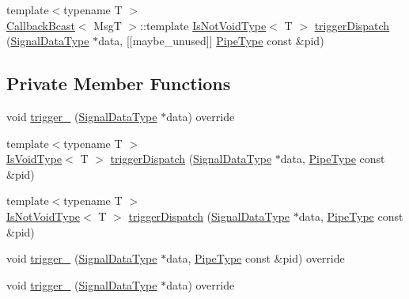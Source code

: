 \begin{DoxyCompactItemize}
\item 
{\footnotesize template$<$typename T $>$ }\\\hyperlink{structvt_1_1pipe_1_1callback_1_1_callback_bcast}{Callback\+Bcast}$<$ MsgT $>$\+::template \hyperlink{structvt_1_1pipe_1_1callback_1_1_callback_bcast_a3f5efa2edf7f4c47fe047e086e63a477}{Is\+Not\+Void\+Type}$<$ T $>$ \hyperlink{structvt_1_1pipe_1_1callback_1_1_callback_bcast_a20640706bfaf002e19d6e085200bd7b8}{trigger\+Dispatch} (\hyperlink{structvt_1_1pipe_1_1callback_1_1_callback_bcast_aaf994b71056001334d30d74fa9c958f9}{Signal\+Data\+Type} $\ast$data, \mbox{[}\mbox{[}maybe\+\_\+unused\mbox{]}\mbox{]} \hyperlink{namespacevt_ac9852acda74d1896f48f406cd72c7bd3}{Pipe\+Type} const \&pid)
\end{DoxyCompactItemize}
\subsection*{Private Member Functions}
\begin{DoxyCompactItemize}
\item 
void \hyperlink{structvt_1_1pipe_1_1callback_1_1_callback_bcast_acc7d0eda09ac15644f876fdab691e269}{trigger\+\_\+} (\hyperlink{structvt_1_1pipe_1_1callback_1_1_callback_bcast_aaf994b71056001334d30d74fa9c958f9}{Signal\+Data\+Type} $\ast$data) override
\item 
{\footnotesize template$<$typename T $>$ }\\\hyperlink{structvt_1_1pipe_1_1callback_1_1_callback_bcast_a3ca08c23824cfac76b837311a1d2c929}{Is\+Void\+Type}$<$ T $>$ \hyperlink{structvt_1_1pipe_1_1callback_1_1_callback_bcast_a8db0ff95fe319e739a93e87661365a5a}{trigger\+Dispatch} (\hyperlink{structvt_1_1pipe_1_1callback_1_1_callback_bcast_aaf994b71056001334d30d74fa9c958f9}{Signal\+Data\+Type} $\ast$data, \hyperlink{namespacevt_ac9852acda74d1896f48f406cd72c7bd3}{Pipe\+Type} const \&pid)
\item 
{\footnotesize template$<$typename T $>$ }\\\hyperlink{structvt_1_1pipe_1_1callback_1_1_callback_bcast_a3f5efa2edf7f4c47fe047e086e63a477}{Is\+Not\+Void\+Type}$<$ T $>$ \hyperlink{structvt_1_1pipe_1_1callback_1_1_callback_bcast_a6a0c65ef395baea684879a696e9fa8f1}{trigger\+Dispatch} (\hyperlink{structvt_1_1pipe_1_1callback_1_1_callback_bcast_aaf994b71056001334d30d74fa9c958f9}{Signal\+Data\+Type} $\ast$data, \hyperlink{namespacevt_ac9852acda74d1896f48f406cd72c7bd3}{Pipe\+Type} const \&pid)
\item 
void \hyperlink{structvt_1_1pipe_1_1callback_1_1_callback_bcast_a8c7fea2fd47017f1cd55f249ce5111a0}{trigger\+\_\+} (\hyperlink{structvt_1_1pipe_1_1callback_1_1_callback_bcast_aaf994b71056001334d30d74fa9c958f9}{Signal\+Data\+Type} $\ast$data, \hyperlink{namespacevt_ac9852acda74d1896f48f406cd72c7bd3}{Pipe\+Type} const \&pid) override
\item 
void \hyperlink{structvt_1_1pipe_1_1callback_1_1_callback_bcast_acc7d0eda09ac15644f876fdab691e269}{trigger\+\_\+} (\hyperlink{structvt_1_1pipe_1_1callback_1_1_callback_bcast_aaf994b71056001334d30d74fa9c958f9}{Signal\+Data\+Type} $\ast$data) override
\end{DoxyCompactItemize}
